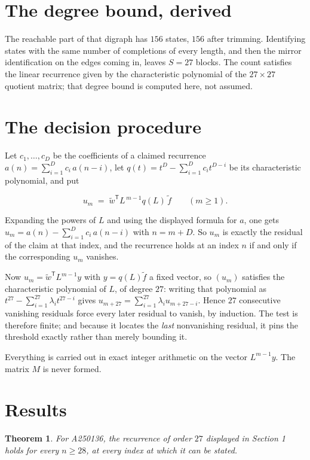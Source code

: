 \documentclass[11pt]{article}
\newtheorem{theorem}{Theorem}
\theoremstyle{definition}
\begin{document}
\section{The degree bound, derived}

The reachable part of that digraph has $156$ states, $156$ after trimming. Identifying states with the same number of completions of every length, and then the mirror identification on the edges coming in, leaves $S = 27$ blocks. The count satisfies the linear recurrence given by the characteristic polynomial of the $27\times27$ quotient matrix; that degree bound is computed here, not assumed.

\section{The decision procedure}

Let $c_1,\dots,c_D$ be the coefficients of a claimed recurrence $a(n) = \sum_{i=1}^{D} c_i\,a(n-i)$, let $q(t) = t^{D} - \sum_{i=1}^{D} c_i t^{D-i}$ be its characteristic polynomial, and put

\[u_m \;=\; \tilde w^{\mathsf T} L^{\,m-1} q(L)\,\tilde f \qquad (m \ge 1).\]

Expanding the powers of $L$ and using the displayed formula for $a$, one gets $u_m = a(n) - \sum_{i=1}^{D} c_i\,a(n-i)$ with $n = m + D$. So $u_m$ is exactly the residual of the claim at that index, and the recurrence holds at an index $n$ if and only if the corresponding $u_m$ vanishes.

Now $u_m = \tilde w^{\mathsf T} L^{m-1} y$ with $y = q(L)\tilde f$ a fixed vector, so $(u_m)$ satisfies the characteristic polynomial of $L$, of degree $27$: writing that polynomial as $t^{27} - \sum_{i=1}^{27} \lambda_i t^{27-i}$ gives $u_{m+27} = \sum_{i=1}^{27} \lambda_i u_{m+27-i}$. Hence $27$ consecutive vanishing residuals force every later residual to vanish, by induction. The test is therefore finite; and because it locates the {\itshape last} nonvanishing residual, it pins the threshold exactly rather than merely bounding it.

Everything is carried out in exact integer arithmetic on the vector $L^{m-1}y$. The matrix $M$ is never formed.

\section{Results}

\begin{theorem} For A250136, the recurrence of order $27$ displayed in Section 1 holds for every $n \ge 28$, at every index at which it can be stated.\end{theorem}
\end{document}
